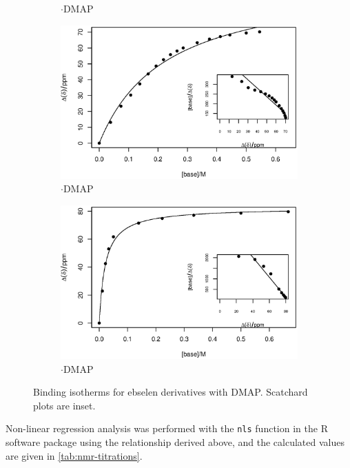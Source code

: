 \begin{refsection}
\begin{figure}
\begin{subfigure}{0.45\linewidth}
    \caption{$\cdot$DMAP}
  \end{subfigure}
  \begin{subfigure}{0.45\linewidth}
    \includegraphics[width=\linewidth]{Figures/nmr-titration/4br-ebs-dmap.eps}
    \caption{$\cdot$DMAP}
  \end{subfigure}
  \begin{subfigure}{0.45\linewidth}
    \includegraphics[width=\linewidth]{Figures/nmr-titration/4cn-ebs-dmap.eps}
    \caption{$\cdot$DMAP}
  \end{subfigure}
  \caption[NMR titration binding isotherms]{Binding isotherms for ebselen derivatives  with DMAP. Scatchard plots are inset.}
  \label{fig:nmr-titrations}
\end{figure}

Non-linear regression analysis was performed with the \texttt{nls} function in the R software package using the relationship derived above, and the calculated values are given in \cref{tab:nmr-titrations}.\autocite{R}


\end{refsection}

